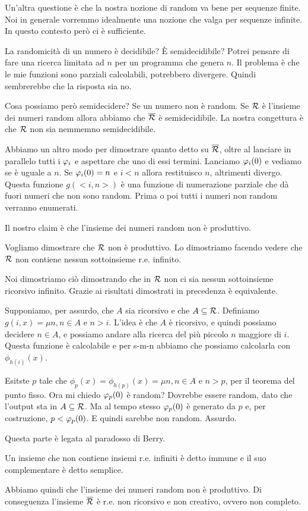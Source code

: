 Un'altra questione è che la nostra nozione di random va bene per sequenze finite. Noi in generale
vorremmo idealmente una nozione che valga per sequenze infinite. In questo contesto però ci è
sufficiente.

La randomicità di un numero è decidibile? È semidecidibile? Potrei pensare di fare una ricerca
limitata ad $n$ per un programma che genera $n$. Il problema è che le mie funzioni sono parziali
calcolabili, potrebbero divergere. Quindi sembrerebbe che la risposta sia no.

Cosa possiamo però semidecidere? Se un numero non è random. Se $\mathcal{R}$ è l'insieme dei numeri random
allora abbiamo che $\overline{\mathcal{R}}$ è semidecidibile. La nostra congettura è che $\mathcal{R}$ non sia nemmemno
semidecidibile.

Abbiamo un altro modo per dimostrare quanto detto su $\overline{\mathcal{R}}$, oltre al lanciare in parallelo
tutti i $\varphi_{i}$ e aspettare che uno di essi termini. Lanciamo $\varphi_{i}(0)$ e vediamo se è uguale a
$n$. Se $\varphi_{i}(0) = n$ e $i < n$ allora restituisco $n$, altrimenti divergo. Questa funzione
$g(<i,n>)$ è una funzione di numerazione parziale che dà fuori numeri che non sono random. Prima o
poi tutti i numeri non random verranno enumerati.

Il nostro claim è che l'insieme dei numeri random non è produttivo.

Vogliamo dimostrare che $\mathcal{R}$ non è produttivo. Lo dimostriamo facendo vedere che $\mathcal{R}$ non contiene
nessun sottoinsieme r.e. infinito.

Noi dimostriamo ciò dimostrando che in $\mathcal{R}$ non ci sia nessun sottoinsieme ricorsivo infinito.
Grazie ai risultati dimostrati in precedenza è equivalente.

Supponiamo, per assurdo, che $A$ sia ricorsivo e che $A \subseteq \mathcal{R}$. Definiamo $g(i,x) = \mu n, n \in A$
e $n > i$. L'idea è che $A$ è ricorsivo, e quindi possiamo decidere $n \in A$, e possiamo andare alla
ricerca del più piccolo $n$ maggiore di $i$. Questa funzione è calcolabile e per s-m-n abbiamo che
possiamo calcolarla con $\phi_{h(i)}(x)$. 

Esitste $p$ tale che $\phi_{p}(x) = \phi_{h(p)}(x) = \mu n, n \in A$ e $n > p$, per il teorema del
punto fisso. Ora mi chiedo $\varphi_{p}(0)$ è random? Dovrebbe essere random, dato che l'output sta in $A
\subseteq \mathcal{R}$. Ma al tempo stesso $\varphi_{p}(0)$ è generato da $p$ e, per costruzione, $p < \varphi_{p}(0)$. E
quindi sarebbe non random. Assurdo.

Questa parte è legata al paradosso di Berry.

Un insieme che non contiene insiemi r.e. infiniti è detto immune e il suo complementare è detto
semplice.

Abbiamo quindi che l'insieme dei numeri random non è produttivo. Di conseguenza l'insieme $\overline{\mathcal{R}}$ 
è r.e. non ricorsivo e non creativo, ovvero non completo.

